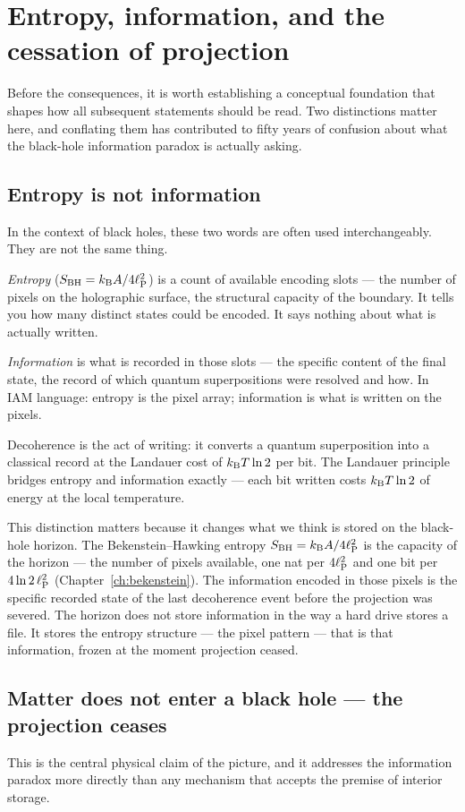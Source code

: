 \section{Entropy, information, and the cessation of projection}\label{sec:bi_entropy}
Before the consequences, it is worth establishing a conceptual foundation that shapes how all subsequent statements should be read. Two distinctions matter
here, and conflating them has contributed to fifty years of confusion about what the black-hole information paradox is actually asking.

\subsection{Entropy is not information}
In the context of black holes, these two words are often used interchangeably. They are not the same thing.

\emph{Entropy} ($S_{\rm BH}=k_{\mathrm B} A/4\ell_{\mathrm P}^2$) is a count of available encoding slots --- the number of pixels on the holographic surface, the structural capacity of the
boundary. It tells you how many distinct states could be encoded. It says nothing about what is actually written.

\emph{Information} is what is recorded in those slots --- the specific content of the final state, the record of which quantum superpositions were resolved and
how. In IAM language: entropy is the pixel array; information is what is written on the pixels.

Decoherence is the act of writing: it converts a quantum superposition into a classical record at the Landauer cost of $k_{\mathrm B} T\ln2$ per bit. The Landauer
principle bridges entropy and information exactly --- each bit written costs $k_{\mathrm B} T\ln2$ of energy at the local temperature.

This distinction matters because it changes what we think is stored on the black-hole horizon. The Bekenstein--Hawking entropy $S_{\rm BH}=k_{\mathrm B} A/4\ell_{\mathrm P}^2$ is the
capacity of the horizon --- the number of pixels available, one nat per $4\ell_{\mathrm P}^2$ and one bit per $4\ln2\,\ell_{\mathrm P}^2$ (Chapter~\ref{ch:bekenstein}). The information encoded in
those pixels is the specific recorded state of the last decoherence event before the projection was severed. The horizon does not store information in the
way a hard drive stores a file. It stores the entropy structure --- the pixel pattern --- that is that information, frozen at the moment projection ceased.
\interp

\subsection{Matter does not enter a black hole --- the projection ceases}
This is the central physical claim of the picture, and it addresses the information paradox more directly than any mechanism that accepts the premise of
interior storage.

